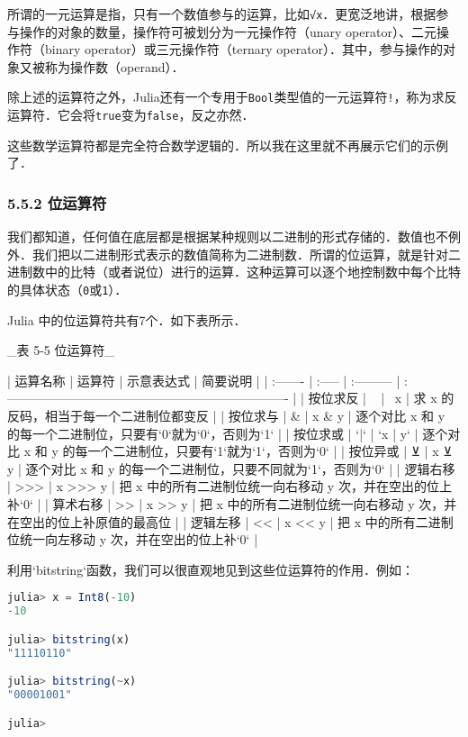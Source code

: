 所谓的一元运算是指，只有一个数值参与的运算，比如\verb|√x|．更宽泛地讲，根据参与操作的对象的数量，操作符可被划分为一元操作符（unary operator）、二元操作符（binary operator）或三元操作符（ternary operator）．其中，参与操作的对象又被称为操作数（operand）．

除上述的运算符之外，Julia还有一个专用于\verb|Bool|类型值的一元运算符\verb|!|，称为求反运算符．它会将\verb|true|变为\verb|false|，反之亦然．

这些数学运算符都是完全符合数学逻辑的．所以我在这里就不再展示它们的示例了．

\subsubsection{5.5.2 位运算符}

我们都知道，任何值在底层都是根据某种规则以二进制的形式存储的．数值也不例外．我们把以二进制形式表示的数值简称为二进制数．所谓的位运算，就是针对二进制数中的比特（或者说位）进行的运算．这种运算可以逐个地控制数中每个比特的具体状态（\verb|0|或\verb|1|）．

Julia 中的位运算符共有7个．如下表所示．

_表 5-5 位运算符_

| 运算名称 | 运算符 | 示意表达式 | 简要说明                                                             |
| :------- | :----- | :--------- | :------------------------------------------------------------------- |
| 按位求反 | ~      | ~x         | 求 x 的反码，相当于每一个二进制位都变反                              |
| 按位求与 | &      | x & y      | 逐个对比 x 和 y 的每一个二进制位，只要有`0`就为`0`，否则为`1`        |
| 按位求或 | `|`    | `x | y`    | 逐个对比 x 和 y 的每一个二进制位，只要有`1`就为`1`，否则为`0`        |
| 按位异或 | ⊻      | x ⊻ y      | 逐个对比 x 和 y 的每一个二进制位，只要不同就为`1`，否则为`0`         |
| 逻辑右移 | >>>    | x >>> y    | 把 x 中的所有二进制位统一向右移动 y 次，并在空出的位上补`0`          |
| 算术右移 | >>     | x >> y     | 把 x 中的所有二进制位统一向右移动 y 次，并在空出的位上补原值的最高位 |
| 逻辑左移 | <<     | x << y     | 把 x 中的所有二进制位统一向左移动 y 次，并在空出的位上补`0`          |

利用`bitstring`函数，我们可以很直观地见到这些位运算符的作用．例如：

\begin{lstlisting}[language=julia]
julia> x = Int8(-10)
-10

julia> bitstring(x)
"11110110"

julia> bitstring(~x)
"00001001"

julia> 
\end{lstlisting}

